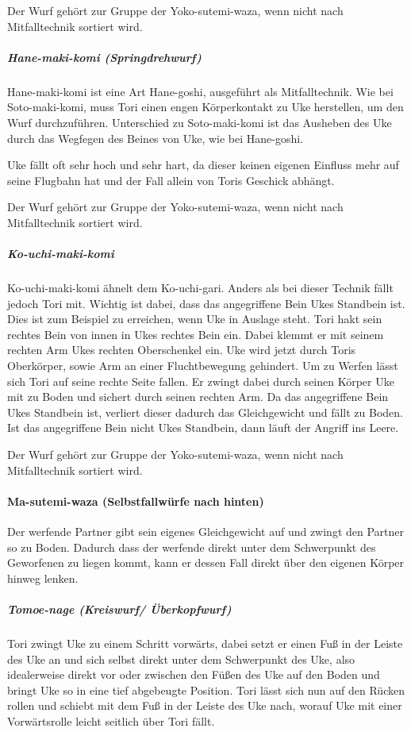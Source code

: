 \documentclass[justified, a4paper, notitlepage, captions=tableheading, nobib]{tufte-handout}
\begin{document}
Der Wurf gehört zur Gruppe der Yoko-sutemi-waza, wenn nicht nach Mitfalltechnik sortiert wird.

\subparagraph{Hane-maki-komi (Springdrehwurf)}
\label{sec:org206121f}
Hane-maki-komi ist eine Art Hane-goshi, ausgeführt als Mitfalltechnik.
Wie bei Soto-maki-komi, muss Tori einen engen Körperkontakt zu Uke herstellen, um den Wurf durchzuführen.
Unterschied zu Soto-maki-komi ist das Ausheben des Uke durch das Wegfegen des Beines von Uke, wie bei Hane-goshi.

Uke fällt oft sehr hoch und sehr hart, da dieser keinen eigenen Einfluss mehr auf seine Flugbahn hat und der Fall allein von Toris Geschick abhängt.

Der Wurf gehört zur Gruppe der Yoko-sutemi-waza, wenn nicht nach Mitfalltechnik sortiert wird.

\subparagraph{Ko-uchi-maki-komi}
\label{sec:orgcd256af}
Ko-uchi-maki-komi ähnelt dem Ko-uchi-gari. Anders als bei dieser Technik fällt jedoch Tori mit. Wichtig ist dabei, dass das angegriffene Bein Ukes Standbein ist. Dies ist zum Beispiel zu erreichen, wenn Uke in Auslage steht. Tori hakt sein rechtes Bein von innen in Ukes rechtes Bein ein. Dabei klemmt er mit seinem rechten Arm Ukes rechten Oberschenkel ein. Uke wird jetzt durch Toris Oberkörper, sowie Arm an einer Fluchtbewegung gehindert. Um zu Werfen lässt sich Tori auf seine rechte Seite fallen. Er zwingt dabei durch seinen Körper Uke mit zu Boden und sichert durch seinen rechten Arm. Da das angegriffene Bein Ukes Standbein ist, verliert dieser dadurch das Gleichgewicht und fällt zu Boden. Ist das angegriffene Bein nicht Ukes Standbein, dann läuft der Angriff ins Leere.

Der Wurf gehört zur Gruppe der Yoko-sutemi-waza, wenn nicht nach Mitfalltechnik sortiert wird.

\paragraph{Ma-sutemi-waza (Selbstfallwürfe nach hinten)}
\label{sec:org3db3533}

Der werfende Partner gibt sein eigenes Gleichgewicht auf und zwingt den Partner so zu Boden. Dadurch dass der werfende direkt unter dem Schwerpunkt des Geworfenen zu liegen kommt, kann er dessen Fall direkt über den eigenen Körper hinweg lenken.

\subparagraph{Tomoe-nage (Kreiswurf/ Überkopfwurf)}
\label{sec:org1c617b6}

Tori zwingt Uke zu einem Schritt vorwärts, dabei setzt er einen Fuß in der Leiste des Uke an und sich selbst direkt unter dem Schwerpunkt des Uke, also idealerweise direkt vor oder zwischen den Füßen des Uke auf den Boden und bringt Uke so in eine tief abgebeugte Position. Tori lässt sich nun auf den Rücken rollen und schiebt mit dem Fuß in der Leiste des Uke nach, worauf Uke mit einer Vorwärtsrolle leicht seitlich über Tori fällt.
\end{document}
